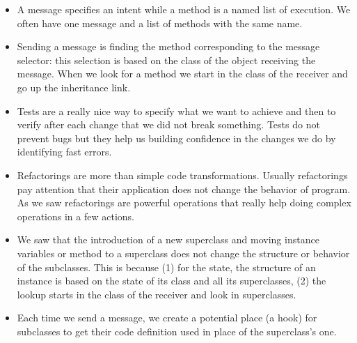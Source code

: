 \documentclass[10pt,twoside,english]{_support/latex/sbabook/sbabook}
\begin{document}
\begin{itemize}
\item A message specifies an intent while a method is a named list of execution. We often have one message and a list of methods with the same name. 
\item Sending a message is finding the method corresponding to the message selector: this selection is based on the class of the object receiving the message. When we look for a method we start in the class of the receiver and go up the inheritance link. 
\item Tests are a really nice way to specify what we want to achieve and then to verify after each change that we did not break something. Tests do not prevent bugs but they help us building confidence in the changes we do by identifying fast errors. 
\item Refactorings are more than simple code transformations. Usually refactorings pay attention that their application does not change the behavior of program. As we saw refactorings are powerful operations that really help doing complex operations in a few actions. 
\item We saw that the introduction of a new superclass and moving instance variables or method to a superclass does not change the structure or behavior of the subclasses. This is because (1) for the state, the structure of an instance is based on the state of its class and all its superclasses, (2) the lookup starts in the class of the receiver and look in superclasses. 
\item Each time we send a message, we create a potential place (a hook) for subclasses to get their code definition used in place of the superclass's one.
\end{itemize}


\backmatter



\end{document}
